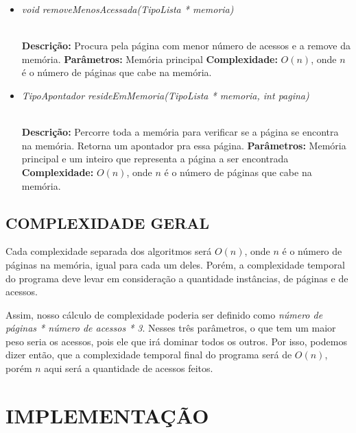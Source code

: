 \documentclass[12pt]{article}
\begin{document}
\vspace{0.2 true cm}

\begin{itemize}
 \item \begin{large}\textit{void removeMenosAcessada(TipoLista * memoria)}\end{large}\\
 \subitem \textbf{Descrição:} Procura pela página com menor número de acessos e a remove da memória.
 \subitem \textbf{Parâmetros:} Memória principal
 \subitem \textbf{Complexidade:} $O(n)$, onde $n$ é o número de páginas que cabe na memória.
\end{itemize}

\vspace{0.2 true cm}

\begin{itemize}
 \item \begin{large}\textit{TipoApontador resideEmMemoria(TipoLista * memoria, int pagina)}\end{large}\\
 \subitem \textbf{Descrição:} Percorre toda a memória para verificar se a página se encontra na memória. Retorna um apontador pra essa página.
 \subitem \textbf{Parâmetros:} Memória principal e um inteiro que representa a página a ser encontrada
 \subitem \textbf{Complexidade:} $O(n)$, onde $n$ é o número de páginas que cabe na memória.
\end{itemize}

\subsection{COMPLEXIDADE GERAL}
\label{complexidades}

Cada complexidade separada dos algoritmos será $O(n)$, onde $n$ é o número de páginas na memória, igual para cada um deles. Porém, a complexidade temporal do programa deve levar em consideração a quantidade instâncias, de páginas e de acessos.

Assim, nosso cálculo de complexidade poderia ser definido como \textit{número de páginas * número de acessos * 3}. Nesses três parâmetros, o que tem um maior peso seria os acessos, pois ele que irá dominar todos os outros. Por isso, podemos dizer então, que a complexidade temporal final do programa será de $O(n)$, porém $n$ aqui será a quantidade de acessos feitos.

\section{IMPLEMENTAÇÃO}
\label{implementacao}
\end{document}
